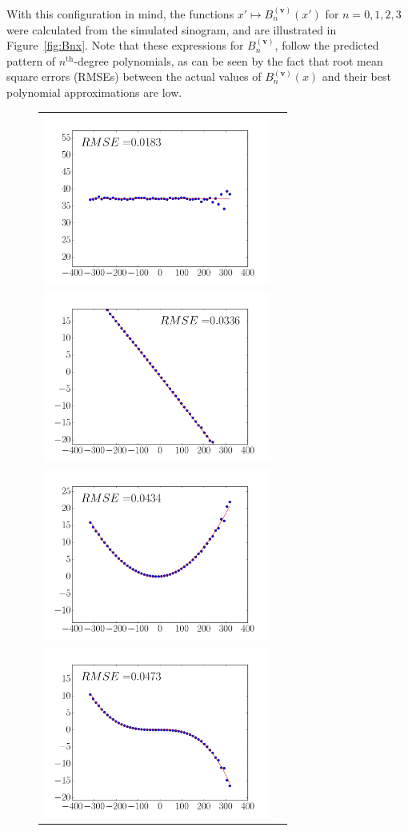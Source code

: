 \documentclass[twocolumn]{IEEEtran}
\newcommand{\bv}{\mathbf{v}}
\newcommand{\Bnv}{B_n^{(\bv)}}
\begin{document}
With this configuration in mind, the functions $x' \mapsto \Bnv(x')$ for $n = 0,1,2,3$ were calculated from the simulated sinogram, and are illustrated in Figure~\ref{fig:Bnx}. Note that these expressions for $\Bnv$, follow the predicted pattern of $n^{\textrm{th}}$-degree polynomials, as can be seen by the fact that root mean square errors (RMSEs) between the actual values of $\Bnv(x)$ and their best polynomial approximations are low.
\begin{figure}
	\centering
	\begin{tabular}{cc}
	\includegraphics[width=75mm]{figs/B0.png} \\
	\includegraphics[width=75mm]{figs/B1.png} \\
	\includegraphics[width=75mm]{figs/B2.png} \\
	\includegraphics[width=75mm]{figs/B3.png} 

\end{tabular}
\end{figure}
\end{document}
